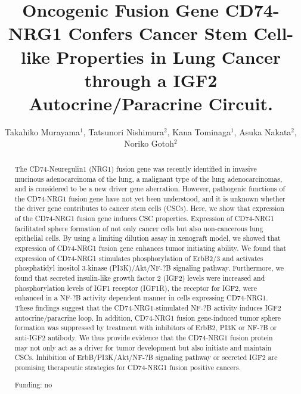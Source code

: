 \documentclass[twoside]{article}
\title{\vspace{-15mm}\fontsize{24pt}{10pt}\selectfont\textbf{Oncogenic Fusion Gene CD74-NRG1 Confers Cancer Stem Cell-like Properties in Lung Cancer through a IGF2 Autocrine/Paracrine Circuit.}} %
\author{Takahiko Murayama$^1$, Tatsunori Nishimura$^2$, Kana Tominaga$^1$, Asuka Nakata$^2$, Noriko Gotoh$^2$}
\affil{1 THE UNIVERSITY OF TOKYO\\ 2 KANAZAWA UNIVERSITY\\ }
\date{}
\begin{document}
\maketitle %

\thispagestyle{fancy} %


\begin{abstract}
The CD74-Neuregulin1 (NRG1) fusion gene was recently identified in invasive mucinous adenocarcinoma of the lung, a malignant type of the lung adenocarcinomas, and is considered to be a new driver gene aberration. However, pathogenic functions of the CD74-NRG1 fusion gene have not yet been understood, and it is unknown whether the driver gene contributes to cancer stem cells (CSCs). Here, we show that expression of the CD74-NRG1 fusion gene induces CSC properties. Expression of CD74-NRG1 facilitated sphere formation of not only cancer cells but also non-cancerous lung epithelial cells. By using a limiting dilution assay in xenograft model, we showed that expression of CD74-NRG1 fusion gene enhances tumor initiating ability. We found that expression of CD74-NRG1 stimulates phosphorylation of ErbB2/3 and activates phosphatidyl inositol 3-kinase (PI3K)/Akt/NF-?B signaling pathway. Furthermore, we found that secreted insulin-like growth factor 2 (IGF2) levels were increased and phosphorylation levels of IGF1 receptor (IGF1R), the receptor for IGF2, were enhanced in a NF-?B activity dependent manner in cells expressing CD74-NRG1. These findings suggest that the CD74-NRG1-stimulated NF-?B activity induces IGF2 autocrine/paracrine loop. In addition, CD74-NRG1 fusion gene-induced tumor sphere formation was suppressed by treatment with inhibitors of ErbB2, PI3K or NF-?B or anti-IGF2 antibody. We thus provide evidence that the CD74-NRG1 fusion protein may not only act as a driver for tumor development but also initiate and maintain CSCs. Inhibition of ErbB/PI3K/Akt/NF-?B signaling pathway or secreted IGF2 are promising therapeutic strategies for CD74-NRG1 fusion positive cancers.

Funding: no
\end{abstract}
\end{document}
